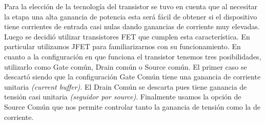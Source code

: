 \documentclass[a4paper, 10pt, spanish]{article}
\begin{document}
Para la elección de la tecnología del transistor se tuvo en cuenta que al necesitar la etapa una alta ganancia de potencia esta será fácil de obtener si el dispositivo tiene corrientes de entrada casi nulas dando ganancias de corriente muy elevadas. Luego se decidió utilizar transistores FET que cumplen esta característica. En particular utilizamos JFET para familiarizarnos con su funcionamiento. En cuanto a la configuración en que funciona el transistor tenemos tres posibilidades, utilizarlo como Gate común, Drain común o Source común. El primer caso se descartó siendo que la configuración Gate Común tiene una ganancia de corriente unitaria \textit{(current buffer)}. El Drain Común se descarta pues tiene ganancia de tensión casi unitaria \textit{(seguidor por source)}. Finalmente usamos la opción de Source Común que nos permite controlar tanto la ganancia de tensión como la de corriente.
\end{document}
